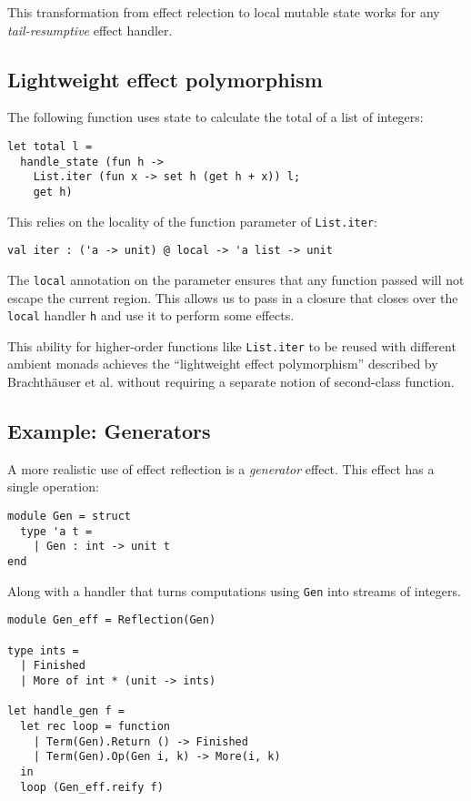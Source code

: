 \documentclass[acmsmall, screen, nonacm]{acmart}
\theoremstyle{definition}
\begin{document}
This transformation from effect relection to local mutable state works
for any \emph{tail-resumptive} effect handler.

\subsection{Lightweight effect polymorphism}

The following function uses state to calculate the total of a list of
integers:
\begin{lstlisting}[style=oxcaml]
let total l =
  handle_state (fun h ->
    List.iter (fun x -> set h (get h + x)) l;
    get h)
\end{lstlisting}
This relies on the locality of the function parameter of
\lstinline[style=oxcaml]{List.iter}:
\begin{lstlisting}[style=oxcaml]
val iter : ('a -> unit) @ local -> 'a list -> unit
\end{lstlisting}
The \lstinline[style=oxcaml]{local} annotation on the parameter ensures
that any function passed will not escape the current region. This allows
us to pass in a closure that closes over the
\lstinline[style=oxcaml]{local} handler \lstinline[style=oxcaml]{h} and
use it to perform some effects.

This ability for higher-order functions like
\lstinline[style=oxcaml]{List.iter} to be reused with different ambient
monads achieves the ``lightweight effect polymorphism'' described by
Brachth{\"a}user et al.\cite{brachthauser2020effects} without requiring
a separate notion of second-class function.

\subsection{Example: Generators}

A more realistic use of effect reflection is a \emph{generator}
effect. This effect has a single operation:
\begin{lstlisting}[style=oxcaml]
module Gen = struct
  type 'a t =
    | Gen : int -> unit t
end
\end{lstlisting}
Along with a handler that turns computations using
\lstinline[style=oxcaml]{Gen} into streams of integers.
\begin{lstlisting}[style=oxcaml]
module Gen_eff = Reflection(Gen)

type ints =
  | Finished
  | More of int * (unit -> ints)

let handle_gen f =
  let rec loop = function
    | Term(Gen).Return () -> Finished
    | Term(Gen).Op(Gen i, k) -> More(i, k)
  in
  loop (Gen_eff.reify f)
\end{lstlisting}
\end{document}
